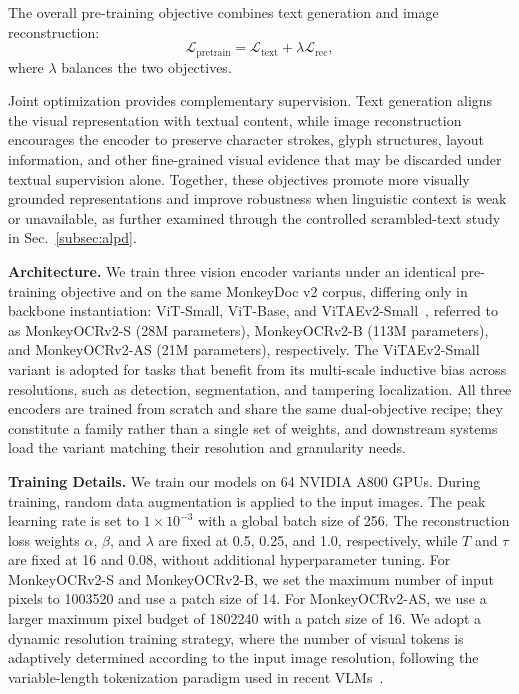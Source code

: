 \documentclass{article}
\begin{document}
The overall pre-training objective combines text generation and image reconstruction:
\begin{equation}
\mathcal{L}_{\mathrm{pretrain}}
=
\mathcal{L}_{\mathrm{text}}
+
\lambda \mathcal{L}_{\mathrm{rec}},
\label{eq:pretraining_objective}
\end{equation}
where $\lambda$ balances the two objectives.

Joint optimization provides complementary supervision. Text generation aligns the visual representation with textual content, while image reconstruction encourages the encoder to preserve character strokes, glyph structures, layout information, and other fine-grained visual
evidence that may be discarded under textual supervision alone. Together, these objectives promote more visually grounded representations and improve robustness when linguistic context is weak or unavailable, as further examined through the controlled scrambled-text study in Sec.~\ref{subsec:alpd}.





 



  



\textbf{Architecture.} 
We train three vision encoder variants under an identical pre-training objective and on the same MonkeyDoc v2 corpus, differing only in backbone instantiation: ViT-Small, ViT-Base, and ViTAEv2-Small~\cite{vitaev2}, referred to as MonkeyOCRv2-S (28M parameters), MonkeyOCRv2-B (113M parameters), and MonkeyOCRv2-AS (21M parameters), respectively. 
The ViTAEv2-Small variant is adopted for tasks that benefit from its multi-scale inductive bias across resolutions, such as detection, segmentation, and tampering localization. All three encoders are trained from scratch and share the same dual-objective recipe; they constitute a family rather than a single set of weights, and downstream systems load the variant matching their resolution and granularity needs.

\textbf{Training Details.}
We train our models on 64 NVIDIA A800 GPUs. During training, random data augmentation is applied to the input images. The peak learning rate is set to $1\times10^{-3}$ with a global batch size of 256. The reconstruction loss weights $\alpha$, $\beta$, and $\lambda$ are fixed at 0.5, 0.25, and 1.0, respectively, while $T$ and $\tau$ are fixed at 16 and 0.08, without additional hyperparameter tuning. For MonkeyOCRv2-S and MonkeyOCRv2-B, we set the maximum number of input pixels to 1003520 and use a patch size of 14. For MonkeyOCRv2-AS, we use a larger maximum pixel budget of 1802240 with a patch size of 16. We adopt a dynamic resolution training strategy, where the number of visual tokens is adaptively determined according to the input image resolution, following the variable-length tokenization paradigm used in recent VLMs~\cite{qwen25}.
\end{document}
